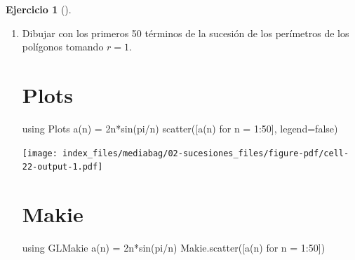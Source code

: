 \documentclass[
  a4paper,
]{scrreport}
\newenvironment{Shaded}{\begin{snugshade}}{\end{snugshade}}
\newcommand{\BuiltInTok}[1]{\textcolor[rgb]{0.00,0.23,0.31}{#1}}
\newcommand{\ConstantTok}[1]{\textcolor[rgb]{0.56,0.35,0.01}{#1}}
\newcommand{\FloatTok}[1]{\textcolor[rgb]{0.68,0.00,0.00}{#1}}
\newcommand{\FunctionTok}[1]{\textcolor[rgb]{0.28,0.35,0.67}{#1}}
\newcommand{\ImportTok}[1]{\textcolor[rgb]{0.00,0.46,0.62}{#1}}
\newcommand{\NormalTok}[1]{\textcolor[rgb]{0.00,0.23,0.31}{#1}}
\newcommand{\OperatorTok}[1]{\textcolor[rgb]{0.37,0.37,0.37}{#1}}
\theoremstyle{definition}
\newtheorem{exercise}{Ejercicio}[chapter]
\theoremstyle{remark}
\begin{document}
\begin{exercise}[]
\begin{enumerate}
\begin{tcolorbox}
\begin{verbatim}
[2.938926261462366, 3.1395259764656687, 3.1415719827794755, 3.141592446881286, 3.141592651522708, 3.1415926535691225]
\end{verbatim}

  \end{tcolorbox}
\item
  Dibujar con los primeros 50 términos de la sucesión de los perímetros
  de los polígonos tomando \(r=1\).

  \begin{tcolorbox}[enhanced jigsaw, bottomtitle=1mm, rightrule=.15mm, left=2mm, colback=white, title=\textcolor{quarto-callout-tip-color}{\faLightbulb}\hspace{0.5em}{Solución}, bottomrule=.15mm, colframe=quarto-callout-tip-color-frame, toprule=.15mm, leftrule=.75mm, opacityback=0, coltitle=black, breakable, colbacktitle=quarto-callout-tip-color!10!white, arc=.35mm, toptitle=1mm, titlerule=0mm, opacitybacktitle=0.6]

  \section{Plots}

\begin{Shaded}
\begin{Highlighting}[]
\ImportTok{using} \BuiltInTok{Plots}
\FunctionTok{a}\NormalTok{(n) }\OperatorTok{=} \FloatTok{2}\FunctionTok{n*sin}\NormalTok{(}\ConstantTok{pi}\OperatorTok{/}\NormalTok{n)}
\FunctionTok{scatter}\NormalTok{([}\FunctionTok{a}\NormalTok{(n) for n }\OperatorTok{=} \FloatTok{1}\OperatorTok{:}\FloatTok{50}\NormalTok{], legend}\OperatorTok{=}\ConstantTok{false}\NormalTok{)}
\end{Highlighting}
\end{Shaded}

  \texttt{[image: index\_files/mediabag/02-sucesiones\_files/figure-pdf/cell-22-output-1.pdf]}

  \section{Makie}

\begin{Shaded}
\begin{Highlighting}[]
\ImportTok{using} \BuiltInTok{GLMakie}
\FunctionTok{a}\NormalTok{(n) }\OperatorTok{=} \FloatTok{2}\FunctionTok{n*sin}\NormalTok{(}\ConstantTok{pi}\OperatorTok{/}\NormalTok{n)}
\NormalTok{Makie.}\FunctionTok{scatter}\NormalTok{([}\FunctionTok{a}\NormalTok{(n) for n }\OperatorTok{=} \FloatTok{1}\OperatorTok{:}\FloatTok{50}\NormalTok{])}
\end{Highlighting}
\end{Shaded}


\end{tcolorbox}
\end{enumerate}
\end{exercise}
\end{document}
